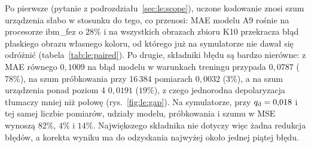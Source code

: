 Po pierwsze (pytanie z podrozdziału~\ref{sec:le:scope}), uczone kodowanie znosi szum urządzenia słabo w stosunku do tego, co przenosi: MAE modelu A9 rośnie na procesorze ibm\_fez o $28\%$ i na wszystkich obrazach zbioru K10 przekracza błąd płaskiego obrazu własnego koloru, od którego już na symulatorze nie dawał się odróżnić (tabela~\ref{tab:le:paired}).
Po drugie, składniki błędu są bardzo nierówne: z MAE równego $0{,}1009$ na błąd modelu w warunkach treningu przypada $0{,}0787$ ($78\%$), na szum próbkowania przy 16\,384 pomiarach $0{,}0032$ ($3\%$), a na szum urządzenia ponad poziom 4 $0{,}0191$ ($19\%$), z czego jednorodna depolaryzacja tłumaczy mniej niż połowę (rys.~\ref{fig:le:gap}).
Na symulatorze, przy $q_{\mathrm{d}}=0{,}018$ i tej samej liczbie pomiarów, udziały modelu, próbkowania i szumu w MSE wynoszą $82\%$, $4\%$ i $14\%$.
Największego składnika nie dotyczy więc żadna redukcja błędów, a korekta wyniku ma do odzyskania najwyżej około jednej piątej błędu.

